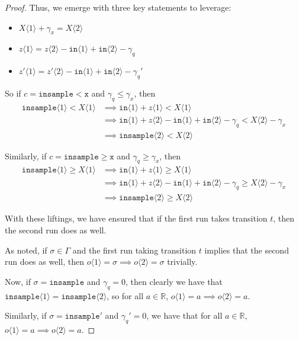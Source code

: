 \documentclass[12pt]{article}
\newcommand{\RR}{\mathbb{R}}
\newcommand{\gguard}[1][x]{\texttt{insample}\geq #1}
\newcommand{\lguard}[1][x]{\texttt{insample} < #1}
\newcommand{\brangle}[1]{\langle #1 \rangle}
\theoremstyle{definition}
\begin{document}
\begin{proof}
Thus, we emerge with three key statements to leverage:\begin{itemize}
    \item $X\brangle{1} + \gamma_x = X\brangle{2}$
    \item $z\brangle{1} = z\brangle{2} - \texttt{in}\brangle{1}+\texttt{in}\brangle{2}-\gamma_q$
    \item $z'\brangle{1} = z'\brangle{2} - \texttt{in}\brangle{1}+\texttt{in}\brangle{2}-\gamma_q'$
\end{itemize}

So if $c=\lguard[\texttt{x}]$ and $\gamma_q\leq \gamma_x$, then \begin{align*}
    \texttt{insample}\brangle{1}<X\brangle{1}&\implies \texttt{in}\brangle{1}+z\brangle{1}<X\brangle{1}\\
    &\implies \texttt{in}\brangle{1}+z\brangle{2}-\texttt{in}\brangle{1}+\texttt{in}\brangle{2}-\gamma_q<X\brangle{2}-\gamma_x\\
    &\implies \texttt{insample}\brangle{2}<X\brangle{2}
\end{align*}

Similarly, if $c=\gguard[\texttt{x}]$ and $\gamma_q\geq \gamma_x$, then \begin{align*}
    \texttt{insample}\brangle{1}\geq X\brangle{1}&\implies \texttt{in}\brangle{1}+z\brangle{1}\geq X\brangle{1}\\
    &\implies \texttt{in}\brangle{1}+z\brangle{2}-\texttt{in}\brangle{1}+\texttt{in}\brangle{2}-\gamma_q\geq X\brangle{2}-\gamma_x\\
    &\implies \texttt{insample}\brangle{2}\geq X\brangle{2}
\end{align*}

With these liftings, we have ensured that if the first run takes transition $t$, then the second run does as well. 

As noted, if $\sigma \in \Gamma$ and the first run taking transition $t$ implies that the second run does as well, then $o\brangle{1} = \sigma \implies o\brangle{2}=\sigma$ trivially.

Now, if $\sigma=\texttt{insample}$ and $\gamma_q=0$, then clearly we have that $\texttt{insample}\brangle{1}=\texttt{insample}\brangle{2}$, so for all $a\in \RR$, $o\brangle{1} = a\implies o\brangle{2} = a$.

Similarly, if $\sigma=\texttt{insample}'$ and $\gamma_q'=0$, we have that for all $a\in \RR$, $o\brangle{1} = a\implies o\brangle{2} = a$.


\end{proof}
\end{document}
